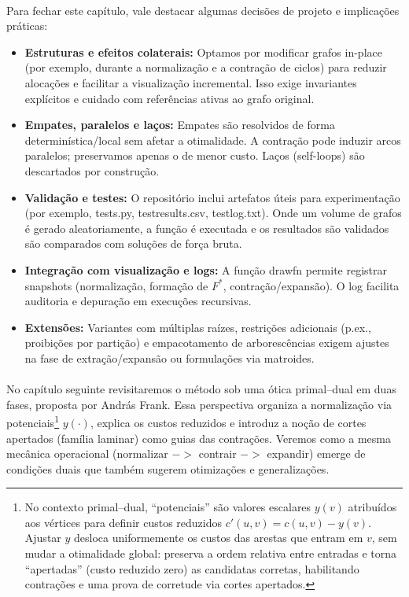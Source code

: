 \documentclass[12pt,a4paper]{article}
\def\texttt#1{#1}%
\def\emph#1{#1}%
\def\_{}%
\def\to{->}%
\begin{document}
\paragraph{}
Para fechar este capítulo, vale destacar algumas decisões de projeto e implicações práticas:
\begin{itemize}\setlength{\itemsep}{2pt}
    \item \textbf{Estruturas e efeitos colaterais:} Optamos por modificar grafos \emph{in-place} (por exemplo, durante a normalização e a contração de ciclos) para reduzir alocações e facilitar a visualização incremental. Isso exige invariantes explícitos e cuidado com referências ativas ao grafo original.
    \item \textbf{Empates, paralelos e laços:} Empates são resolvidos de forma determinística/local sem afetar a otimalidade. A contração pode induzir \emph{arcos paralelos}; preservamos apenas o de menor custo. Laços (self-loops) são descartados por construção.
    \item \textbf{Validação e testes:}  O repositório inclui artefatos úteis para experimentação (por exemplo, \texttt{tests.py}, \texttt{test\_results.csv}, \texttt{test\_log.txt}). Onde um volume de grafos é gerado aleatoriamente, a função é executada e os resultados são validados são comparados com soluções de força bruta.
    \item \textbf{Integração com visualização e logs:} A função \texttt{draw\_fn} permite registrar \emph{snapshots} (normalização, formação de \(F^*\), contração/expansão). O \texttt{log} facilita auditoria e depuração em execuções recursivas.
    \item \textbf{Extensões:} Variantes com múltiplas raízes, restrições adicionais (p.ex., proibições por partição) e empacotamento de arborescências exigem ajustes na fase de extração/expansão ou formulações via matroides.
\end{itemize}

\paragraph{}
No capítulo seguinte revisitaremos o método sob uma \emph{ótica primal–dual} em duas fases, proposta por András Frank. Essa perspectiva organiza a normalização via \emph{potenciais}\footnote{No contexto primal–dual, “potenciais” são valores escalares \(y(v)\) atribuídos aos vértices para definir \emph{custos reduzidos} \(c'(u,v)=c(u,v)-y(v)\). Ajustar \(y\) desloca uniformemente os custos das arestas que \emph{entram} em \(v\), sem mudar a otimalidade global: preserva a ordem relativa entre entradas e torna “apertadas” (custo reduzido zero) as candidatas corretas, habilitando contrações e uma prova de corretude via cortes apertados.} \(y(\cdot)\), explica os \emph{custos reduzidos} e introduz a noção de \emph{cortes apertados} (família laminar) como guias das contrações. Veremos como a mesma mecânica operacional (normalizar \(\to\) contrair \(\to\) expandir) emerge de condições duais que também sugerem otimizações e generalizações.
\end{document}
